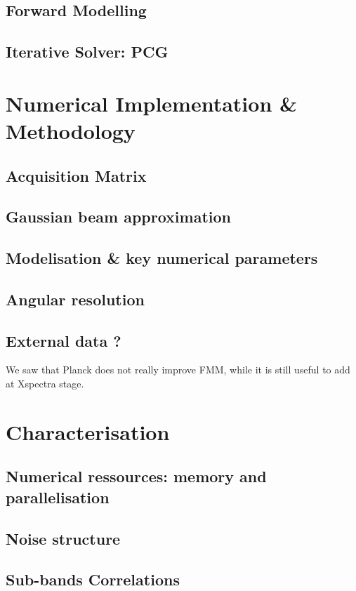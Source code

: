\documentclass[../../thesis.tex]{subfiles}
\begin{document}
\subsection{Forward Modelling}

\subsection{Iterative Solver: PCG}

\section{Numerical Implementation \& Methodology}

\subsection{Acquisition Matrix}

\subsection{Gaussian beam approximation}

\subsection{Modelisation \& key numerical parameters}

\subsection{Angular resolution}

\subsection{External data ?}

We saw that Planck does not really improve FMM, while it is still useful to add at Xspectra stage.

\section{Characterisation}

\subsection{Numerical ressources: memory and parallelisation}

\subsection{Noise structure}

\subsection{Sub-bands Correlations}

\minitoc
\end{document}
